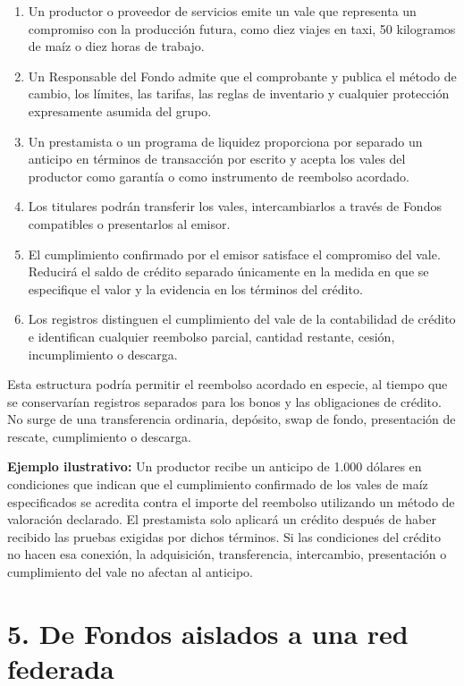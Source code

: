 \documentclass[11pt]{article}
\begin{document}
\begin{enumerate}[leftmargin=*]
\item Un productor o proveedor de servicios emite un vale que representa un compromiso con la producción futura, como diez viajes en taxi, 50 kilogramos de maíz o diez horas de trabajo.
\item Un Responsable del Fondo admite que el comprobante y publica el método de cambio, los límites, las tarifas, las reglas de inventario y cualquier protección expresamente asumida del grupo.
\item Un prestamista o un programa de liquidez proporciona por separado un anticipo en términos de transacción por escrito y acepta los vales del productor como garantía o como instrumento de reembolso acordado.
\item Los titulares podrán transferir los vales, intercambiarlos a través de Fondos compatibles o presentarlos al emisor.
\item El cumplimiento confirmado por el emisor satisface el compromiso del vale. Reducirá el saldo de crédito separado únicamente en la medida en que se especifique el valor y la evidencia en los términos del crédito.
\item Los registros distinguen el cumplimiento del vale de la contabilidad de crédito e identifican cualquier reembolso parcial, cantidad restante, cesión, incumplimiento o descarga.
\end{enumerate}
Esta estructura podría permitir el reembolso acordado en especie, al tiempo que se conservarían registros separados para los bonos y las obligaciones de crédito. No surge de una transferencia ordinaria, depósito, swap de fondo, presentación de rescate, cumplimiento o descarga.

\textbf{Ejemplo ilustrativo:} Un productor recibe un anticipo de 1.000 dólares en condiciones que indican que el cumplimiento confirmado de los vales de maíz especificados se acredita contra el importe del reembolso utilizando un método de valoración declarado. El prestamista solo aplicará un crédito después de haber recibido las pruebas exigidas por dichos términos. Si las condiciones del crédito no hacen esa conexión, la adquisición, transferencia, intercambio, presentación o cumplimiento del vale no afectan al anticipo.


\section*{5. De Fondos aislados a una red federada}
\end{document}
